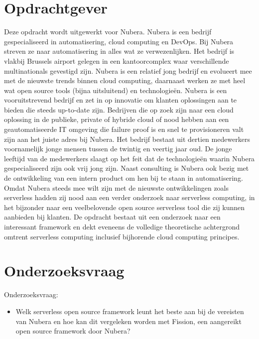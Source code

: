 \section{Opdrachtgever}
\label{sec:opdrachtgever}

Deze opdracht wordt uitgewerkt voor Nubera. Nubera is een bedrijf gespecialiseerd in automatisering, cloud computing en DevOps. Bij Nubera streven ze naar automatisering in alles wat ze verwezenlijken. Het bedrijf is vlakbij Brussels airport gelegen in een kantoorcomplex waar verschillende multinationals gevestigd zijn. Nubera is een relatief jong bedrijf en evolueert mee met de nieuwste trends binnen cloud computing, daarnaast werken ze met heel wat open source tools (bijna uitsluitend) en technologieën. Nubera is een vooruitstrevend bedrijf en zet in op innovatie om klanten oplossingen aan te bieden die steeds up-to-date zijn. Bedrijven die op zoek zijn naar een cloud oplossing in de publieke, private of hybride cloud of nood hebben aan een geautomatiseerde IT omgeving die failure proof is en snel te provisioneren valt zijn aan het juiste adres bij Nubera. Het bedrijf bestaat uit dertien medewerkers voornamelijk jonge mensen tussen de twintig en veertig jaar oud. De jonge leeftijd van de medewerkers slaagt op het feit dat de technologieën waarin Nubera gespecialiseerd zijn ook vrij jong zijn. Naast consulting is Nubera ook bezig met de ontwikkeling van een intern product om hen bij te staan in automatisering.
Omdat Nubera steeds mee wilt zijn met de nieuwste ontwikkelingen zoals serverless hadden zij nood aan een verder onderzoek naar serverless computing, in het bijzonder naar een veelbelovende open source serverless tool die zij kunnen aanbieden bij klanten. De opdracht bestaat uit een onderzoek naar een interessant framework en dekt eveneens de volledige theoretische achtergrond omtrent serverless computing inclusief bijhorende cloud computing principes.

\section{Onderzoeksvraag}
\label{sec:onderzoeksvraag}

Onderzoeksvraag: 
\begin{itemize}
    \item Welk serverless open source framework leunt het beste aan bij de vereisten van Nubera en hoe kan dit vergeleken worden met Fission, een aangereikt open source framework door Nubera?
\end{itemize}

